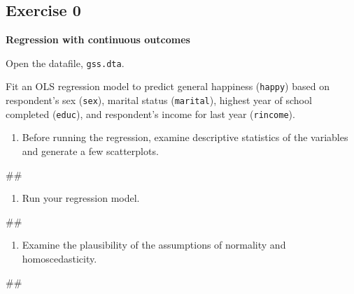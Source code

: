 \documentclass[
]{book}
\newenvironment{Shaded}{\begin{snugshade}}{\end{snugshade}}
\newcommand{\NormalTok}[1]{#1}
\providecommand{\tightlist}{%
  \setlength{\itemsep}{0pt}\setlength{\parskip}{0pt}}
\begin{document}
\hypertarget{exercise-0-7}{%
\subsection{Exercise 0}\label{exercise-0-7}}

\textbf{Regression with continuous outcomes}

Open the datafile, \texttt{gss.dta}.

Fit an OLS regression model to predict general happiness (\texttt{happy}) based on respondent's sex (\texttt{sex}), marital status (\texttt{marital}), highest year of school completed (\texttt{educ}), and respondent's income for last year (\texttt{rincome}).

\begin{enumerate}
\def\labelenumi{\arabic{enumi}.}
\tightlist
\item
  Before running the regression, examine descriptive statistics of the variables and generate a few scatterplots.
\end{enumerate}

\begin{Shaded}
\begin{Highlighting}[]
\NormalTok{\#\#}
\end{Highlighting}
\end{Shaded}

\begin{enumerate}
\def\labelenumi{\arabic{enumi}.}
\setcounter{enumi}{1}
\tightlist
\item
  Run your regression model.
\end{enumerate}

\begin{Shaded}
\begin{Highlighting}[]
\NormalTok{\#\#}
\end{Highlighting}
\end{Shaded}

\begin{enumerate}
\def\labelenumi{\arabic{enumi}.}
\setcounter{enumi}{2}
\tightlist
\item
  Examine the plausibility of the assumptions of normality and homoscedasticity.
\end{enumerate}

\begin{Shaded}
\begin{Highlighting}[]
\NormalTok{\#\#}
\end{Highlighting}
\end{Shaded}
\end{document}
